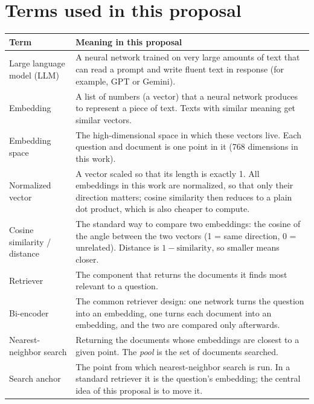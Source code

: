 \documentclass[12pt,a4paper]{article}
\begin{document}
\enlargethispage{1\baselineskip}
\section*{Terms used in this proposal}

\noindent\begin{minipage}{\textwidth}
\footnotesize{}\renewcommand{\arraystretch}{1.18}
\begin{tabularx}{\textwidth}{>{\raggedright\arraybackslash}p{3.7cm}>{\raggedright\arraybackslash}X}
\toprule
Term & Meaning in this proposal \\
\midrule
Large language model (LLM) & A neural network trained on very large amounts of text that can read a prompt and write fluent text in response (for example, GPT or Gemini). \\
Embedding & A list of numbers (a vector) that a neural network produces to represent a piece of text. Texts with similar meaning get similar vectors. \\
Embedding space & The high-dimensional space in which these vectors live. Each question and document is one point in it (768 dimensions in this work). \\
Normalized vector & A vector scaled so that its length is exactly 1. All embeddings in this work are normalized, so that only their direction matters; cosine similarity then reduces to a plain dot product, which is also cheaper to compute. \\
Cosine similarity / distance & The standard way to compare two embeddings: the cosine of the angle between the two vectors (1 = same direction, 0 = unrelated). Distance is $1 - \text{similarity}$, so smaller means closer. \\
Retriever & The component that returns the documents it finds most relevant to a question. \\
Bi-encoder & The common retriever design: one network turns the question into an embedding, one turns each document into an embedding, and the two are compared only afterwards. \\
Nearest-neighbor search & Returning the documents whose embeddings are closest to a given point. The \emph{pool} is the set of documents searched. \\
Search anchor & The point from which nearest-neighbor search is run. In a standard retriever it is the question's embedding; the central idea of this proposal is to move it. \\

\end{tabularx}
\end{minipage}
\end{document}
